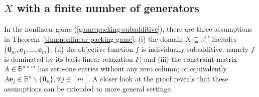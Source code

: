 \documentclass[11pt]{article}\usepackage[]{graphicx}\usepackage[]{xcolor}
\begin{document}
\subsection{$X$ with a finite number of generators}\label{subsec:gene-X-constraint-pack-game}



In the nonlinear game (\ref{game:packing-subadditive}), there are three assumptions in Theorem~\ref{thm:nonlinear-packing-game}: (i) the domain $X\subseteq \mathbb{R}^m_{+}$ includes $\{\mathbf{0}_m, \mathbf{e}_1,\dots, \mathbf{e}_m\}$; (ii) the objective function $f$ is individually subadditive; namely $f$ is dominated by its basis-linear relaxation $F$; and (iii) the constraint matrix $A\in \mathbb{B}^{n\times m}$ has zero-one entries without any zero column; or equivalently $A\mathbf{e}_j\in \mathbb{B}^n\backslash \{\mathbf{0}_n\}, \forall j\in [m]$. A closer look at the proof reveals that these assumptions can be extended to more general settings. 
\end{document}
